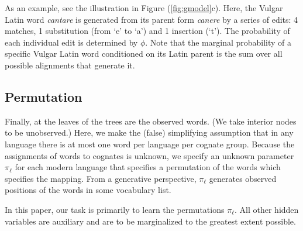 \documentclass[11pt,a4paper]{article}
\begin{document}
As an example, see the illustration in Figure (\ref{fig:gmodel}c).
Here, the Vulgar Latin word \textit{cantare} is generated from its
parent form \textit{canere} by a series of edits: 4 matches, 1
substitution (from `e' to `a') and 1 insertion (`t').
The probability of each individual edit is determined by $\phi$.
Note that the marginal probability of a specific Vulgar Latin word
conditioned on its Latin parent is the sum over all possible
alignments that generate it.

\subsection{Permutation}

Finally, at the leaves of the trees are the observed words. (We
take interior nodes to be unobserved.) Here, we make the (false)
simplifying assumption that in any language there is at most one
word per language per cognate group. Because the assignments of
words to cognates is unknown, we specify an unknown parameter
$\pi_\ell$ for each modern language that specifies a permutation
of the words which specifies the mapping. From a generative
perspective, $\pi_\ell$ generates observed positions of the words
in some vocabulary list.

In this paper, our task is primarily to learn the permutations
$\pi_\ell$. All other hidden variables are auxiliary and are to be marginalized to the greatest extent possible.
\end{document}
